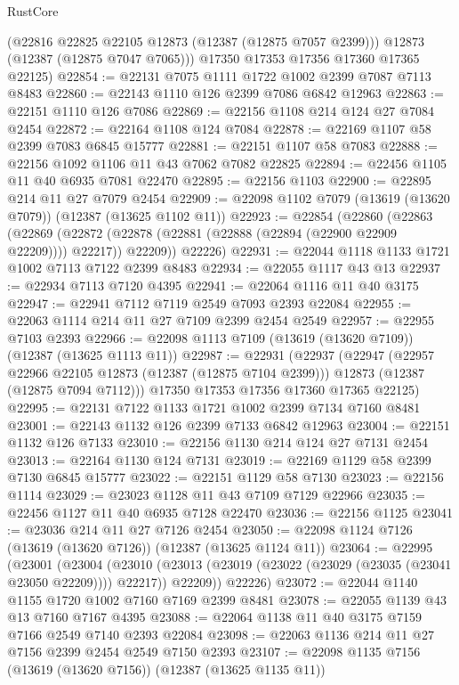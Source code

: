 \begin{lexlean}{RustCore}
\begin{coremodule}
        (@22816 @22825 @22105 @12873 (@12387 (@12875 @7057 @2399)))
        @12873
        (@12387 (@12875 @7047 @7065)))
      @17350
      @17353
      @17356
      @17360
      @17365
      @22125)
@22854 := @22131 @7075 @1111 @1722 @1002 @2399 @7087 @7113 @8483
@22860 := @22143 @1110 @126 @2399 @7086 @6842 @12963
@22863 := @22151 @1110 @126 @7086
@22869 := @22156 @1108 @214 @124 @27 @7084 @2454
@22872 := @22164 @1108 @124 @7084
@22878 := @22169 @1107 @58 @2399 @7083 @6845 @15777
@22881 := @22151 @1107 @58 @7083
@22888 := @22156 @1092 @1106 @11 @43 @7062 @7082 @22825
@22894 := @22456 @1105 @11 @40 @6935 @7081 @22470
@22895 := @22156 @1103
@22900 := @22895 @214 @11 @27 @7079 @2454
@22909 := @22098 @1102 @7079 (@13619 (@13620 @7079)) (@12387 (@13625 @1102 @11))
@22923 := @22854
    (@22860
      (@22863
        (@22869 (@22872 (@22878 (@22881 (@22888 (@22894 (@22900 @22909 @22209)))) @22217)) @22209))
      @22226)
@22931 := @22044 @1118 @1133 @1721 @1002 @7113 @7122 @2399 @8483
@22934 := @22055 @1117 @43 @13
@22937 := @22934 @7113 @7120 @4395
@22941 := @22064 @1116 @11 @40 @3175
@22947 := @22941 @7112 @7119 @2549 @7093 @2393 @22084
@22955 := @22063 @1114 @214 @11 @27 @7109 @2399 @2454 @2549
@22957 := @22955 @7103 @2393
@22966 := @22098 @1113 @7109 (@13619 (@13620 @7109)) (@12387 (@13625 @1113 @11))
@22987 := @22931
    (@22937
      (@22947
        (@22957 @22966 @22105 @12873 (@12387 (@12875 @7104 @2399)))
        @12873
        (@12387 (@12875 @7094 @7112)))
      @17350
      @17353
      @17356
      @17360
      @17365
      @22125)
@22995 := @22131 @7122 @1133 @1721 @1002 @2399 @7134 @7160 @8481
@23001 := @22143 @1132 @126 @2399 @7133 @6842 @12963
@23004 := @22151 @1132 @126 @7133
@23010 := @22156 @1130 @214 @124 @27 @7131 @2454
@23013 := @22164 @1130 @124 @7131
@23019 := @22169 @1129 @58 @2399 @7130 @6845 @15777
@23022 := @22151 @1129 @58 @7130
@23023 := @22156 @1114
@23029 := @23023 @1128 @11 @43 @7109 @7129 @22966
@23035 := @22456 @1127 @11 @40 @6935 @7128 @22470
@23036 := @22156 @1125
@23041 := @23036 @214 @11 @27 @7126 @2454
@23050 := @22098 @1124 @7126 (@13619 (@13620 @7126)) (@12387 (@13625 @1124 @11))
@23064 := @22995
    (@23001
      (@23004
        (@23010 (@23013 (@23019 (@23022 (@23029 (@23035 (@23041 @23050 @22209)))) @22217)) @22209))
      @22226)
@23072 := @22044 @1140 @1155 @1720 @1002 @7160 @7169 @2399 @8481
@23078 := @22055 @1139 @43 @13 @7160 @7167 @4395
@23088 := @22064 @1138 @11 @40 @3175 @7159 @7166 @2549 @7140 @2393 @22084
@23098 := @22063 @1136 @214 @11 @27 @7156 @2399 @2454 @2549 @7150 @2393
@23107 := @22098 @1135 @7156 (@13619 (@13620 @7156)) (@12387 (@13625 @1135 @11))

\end{coremodule}
\end{lexlean}

